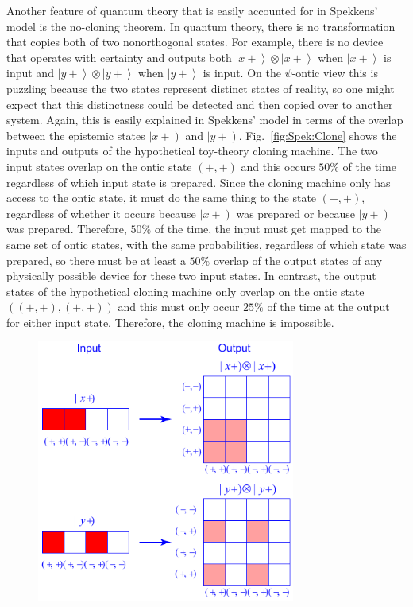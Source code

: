 \documentclass[DIV=calc,paper=a4,fontsize=11pt,twocolumn]{scrartcl} %
\theoremstyle{definition}
\theoremstyle{plain}
\newcommand{\RKet}[1]{\ensuremath{\left \vert #1 \right )}}
\newcommand{\Ket}[1]{\ensuremath{\left \vert #1 \right \rangle}}
\begin{document}
Another feature of quantum theory that is easily accounted for in
Spekkens' model is the no-cloning theorem.  In quantum theory, there
is no transformation that copies both of two nonorthogonal states.
For example, there is no device that operates with certainty and
outputs both $\Ket{x+}\otimes\Ket{x+}$ when $\Ket{x+}$ is input and
$\Ket{y+}\otimes\Ket{y+}$ when $\Ket{y+}$ is input.  On the
$\psi$-ontic view this is puzzling because the two states represent
distinct states of reality, so one might expect that this distinctness
could be detected and then copied over to another system.  Again, this
is easily explained in Spekkens' model in terms of the overlap between
the epistemic states $\RKet{x+}$ and $\RKet{y+}$.
Fig.~\ref{fig:Spek:Clone} shows the inputs and outputs of the
hypothetical toy-theory cloning machine.  The two input states overlap
on the ontic state $(+,+)$ and this occurs $50\%$ of the time
regardless of which input state is prepared.  Since the cloning
machine only has access to the ontic state, it must do the same thing
to the state $(+,+)$, regardless of whether it occurs because
$\RKet{x+}$ was prepared or because $\RKet{y+}$ was prepared.
Therefore, $50\%$ of the time, the input must get mapped to the same
set of ontic states, with the same probabilities, regardless of which
state was prepared, so there must be at least a $50\%$ overlap of the
output states of any physically possible device for these two input
states.  In contrast, the output states of the hypothetical cloning
machine only overlap on the ontic state $((+,+),(+,+))$ and this must
only occur $25\%$ of the time at the output for either input state.
Therefore, the cloning machine is impossible.
\begin{figure}[t!]
\centering
\includegraphics[width=85mm]{Fig4.pdf}
\caption{}
\end{figure}
\end{document}
